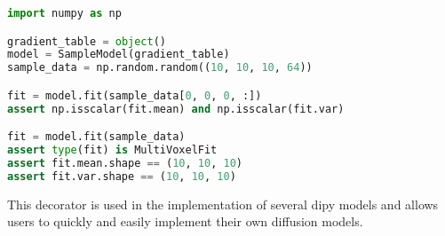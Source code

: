\begin{lstlisting}[language=python]
import numpy as np

gradient_table = object()
model = SampleModel(gradient_table)
sample_data = np.random.random((10, 10, 10, 64))

fit = model.fit(sample_data[0, 0, 0, :])
assert np.isscalar(fit.mean) and np.isscalar(fit.var)

fit = model.fit(sample_data)
assert type(fit) is MultiVoxelFit
assert fit.mean.shape == (10, 10, 10)
assert fit.var.shape == (10, 10, 10)
\end{lstlisting}

This decorator is used in the implementation of several dipy models and allows users to quickly and easily implement their own diffusion models.